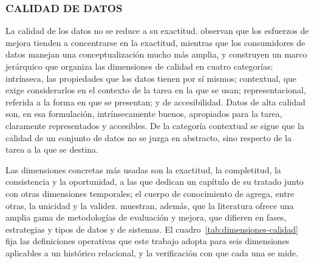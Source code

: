 \subsubsection{CALIDAD DE DATOS}

La calidad de los datos no se reduce a su exactitud. \textcite{WangStrong1996} observan que los esfuerzos de mejora tienden a concentrarse en la exactitud, mientras que los consumidores de datos manejan una conceptualización mucho más amplia, y construyen un marco jerárquico que organiza las dimensiones de calidad en cuatro categorías: intrínseca, las propiedades que los datos tienen por sí mismos; contextual, que exige considerarlos en el contexto de la tarea en la que se usan; representacional, referida a la forma en que se presentan; y de accesibilidad. Datos de alta calidad son, en esa formulación, intrínsecamente buenos, apropiados para la tarea, claramente representados y accesibles. De la categoría contextual se sigue que la calidad de un conjunto de datos no se juzga en abstracto, sino respecto de la tarea a la que se destina.

Las dimensiones concretas más usadas son la exactitud, la completitud, la consistencia y la oportunidad, a las que \textcite{BatiniScannapieco2016} dedican un capítulo de su tratado junto con otras dimensiones temporales; el cuerpo de conocimiento de \textcite{DAMA2017} agrega, entre otras, la unicidad y la validez. \textcite{Batini2009} muestran, además, que la literatura ofrece una amplia gama de metodologías de evaluación y mejora, que difieren en fases, estrategias y tipos de datos y de sistemas. El cuadro~\ref{tab:dimensiones-calidad} fija las definiciones operativas que este trabajo adopta para seis dimensiones aplicables a un histórico relacional, y la verificación con que cada una se mide.

